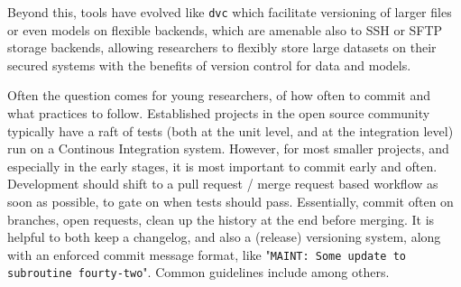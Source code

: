 \documentclass[9pt,bestpractices]{livecoms}
\begin{document}
Beyond this, tools have evolved like \texttt{dvc} which facilitate versioning of larger files or even models on flexible backends, which are amenable also to SSH or SFTP storage backends, allowing researchers to flexibly store large datasets on their secured systems with the benefits of version control for data and models.

Often the question comes for young researchers, of how often to commit and what practices to follow. Established projects in the open source community typically have a raft of tests (both at the unit level, and at the integration level) run on a Continous Integration system. However, for most smaller projects, and especially in the early stages, it is most important to commit early and often. Development should shift to a pull request / merge request based workflow as soon as possible, to gate on when tests should pass. Essentially, commit often on branches, open requests, clean up the history at the end before merging. It is helpful to both keep a changelog, and also a (release) versioning system, along with an enforced commit message format, like "\texttt{MAINT: Some update to subroutine fourty-two}". Common guidelines include  among others.






\end{document}
